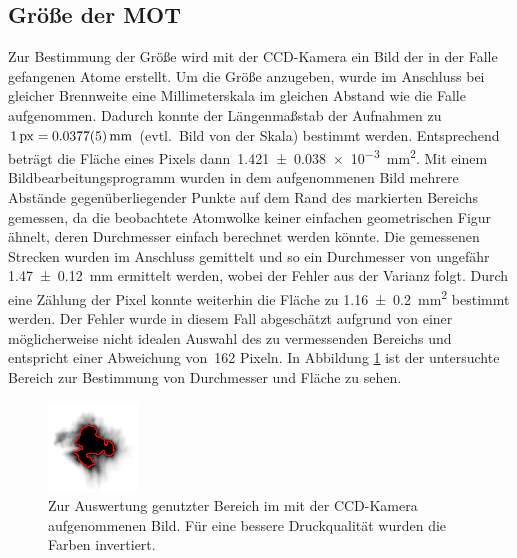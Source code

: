 \documentclass[11pt, a4paper]{article}
\numberwithin{equation}{section}
\newcommand{\korr}[1]{{\color{red}(#1)}}
\begin{document}
\subsection{Größe der MOT}
Zur Bestimmung der Größe wird mit der CCD-Kamera ein Bild der in der Falle gefangenen Atome erstellt.
Um die Größe anzugeben, wurde im Anschluss bei gleicher Brennweite eine Millimeterskala im gleichen Abstand wie die Falle aufgenommen.
Dadurch konnte der Längenmaßstab der Aufnahmen zu~$\SI{1}{px}=\SI{0,0377+-0,0005}{mm}$ \korr{evtl.\ Bild von der Skala} bestimmt werden.
Entsprechend beträgt die Fläche eines Pixels dann~\SI{1.421+-0.038e-3}{mm^2}.
Mit einem Bildbearbeitungsprogramm wurden in dem aufgenommenen Bild mehrere Abstände gegenüberliegender Punkte auf dem Rand des markierten Bereichs gemessen, da die beobachtete Atomwolke keiner einfachen geometrischen Figur ähnelt, deren Durchmesser einfach berechnet werden könnte.
Die gemessenen Strecken wurden im Anschluss gemittelt und so ein Durchmesser von ungefähr \SI{1,47+-0,12}{mm} ermittelt werden, wobei der Fehler aus der Varianz folgt.
Durch eine Zählung der Pixel konnte weiterhin die Fläche zu \SI{1,16+-0,2}{mm^2} bestimmt werden.
Der Fehler wurde in diesem Fall abgeschätzt aufgrund von einer möglicherweise nicht idealen Auswahl des zu vermessenden Bereichs und entspricht einer Abweichung von~\num{162} Pixeln.
In Abbildung \ref{fig:mot_groesse} ist der untersuchte Bereich zur Bestimmung von Durchmesser und Fläche zu sehen.
\begin{figure}[h]
	\centering
	\includegraphics[width=.7\textwidth]{./figures/size_inverted.png}
	\caption{Zur Auswertung genutzter Bereich im mit der CCD-Kamera aufgenommenen Bild. Für eine bessere Druckqualität wurden die Farben invertiert.}
	\label{fig:mot_groesse}
\end{figure}
\end{document}
